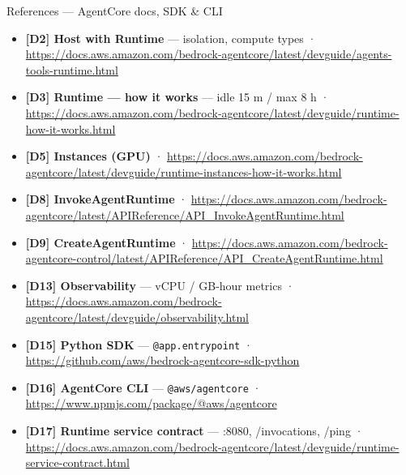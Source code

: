 \documentclass[
  10pt,
  ignorenonframetext,
  aspectratio=169,
  t]{beamer}
\providecommand{\tightlist}{%
  \setlength{\itemsep}{0pt}\setlength{\parskip}{0pt}}
\begin{document}
\begin{frame}{References --- AgentCore docs, SDK \& CLI}
\protect\hypertarget{references-agentcore-docs-sdk-cli}{}
\begin{itemize}
\tightlist
\item
  \textbf{{[}D2{]} Host with Runtime} --- isolation, compute types ·
  \url{https://docs.aws.amazon.com/bedrock-agentcore/latest/devguide/agents-tools-runtime.html}
\item
  \textbf{{[}D3{]} Runtime --- how it works} --- idle 15 m / max 8 h ·
  \url{https://docs.aws.amazon.com/bedrock-agentcore/latest/devguide/runtime-how-it-works.html}
\item
  \textbf{{[}D5{]} Instances (GPU)} ·
  \url{https://docs.aws.amazon.com/bedrock-agentcore/latest/devguide/runtime-instances-how-it-works.html}
\item
  \textbf{{[}D8{]} InvokeAgentRuntime} ·
  \url{https://docs.aws.amazon.com/bedrock-agentcore/latest/APIReference/API_InvokeAgentRuntime.html}
\item
  \textbf{{[}D9{]} CreateAgentRuntime} ·
  \url{https://docs.aws.amazon.com/bedrock-agentcore-control/latest/APIReference/API_CreateAgentRuntime.html}
\item
  \textbf{{[}D13{]} Observability} --- vCPU / GB-hour metrics ·
  \url{https://docs.aws.amazon.com/bedrock-agentcore/latest/devguide/observability.html}
\item
  \textbf{{[}D15{]} Python SDK} --- \texttt{@app.entrypoint} ·
  \url{https://github.com/aws/bedrock-agentcore-sdk-python}
\item
  \textbf{{[}D16{]} AgentCore CLI} --- \texttt{@aws/agentcore} ·
  \url{https://www.npmjs.com/package/@aws/agentcore}
\item
  \textbf{{[}D17{]} Runtime service contract} --- :8080, /invocations,
  /ping ·
  \url{https://docs.aws.amazon.com/bedrock-agentcore/latest/devguide/runtime-service-contract.html}
\end{itemize}
\end{frame}
\end{document}
